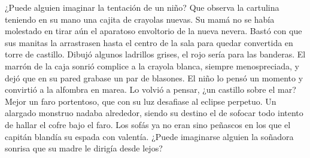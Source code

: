 \markdownRendererInterblockSeparator
{}¿Puede alguien imaginar la tentación de un niño? Que observa la cartulina teniendo en su mano una cajita de crayolas nuevas. Su mamá no se había molestado en tirar aún el aparatoso envoltorio de la nueva nevera. Bastó con que sus manitas la arrastrasen hasta el centro de la sala para quedar convertida en torre de castillo. Dibujó algunos ladrillos grises, el rojo sería para las banderas. El marrón de la caja sonrió complice a la crayola blanca, siempre menospreciada, y dejó que en su pared grabase un par de blasones. El niño lo pensó un momento y convirtió a la alfombra en marea. Lo volvió a pensar, ¿un castillo sobre el mar? Mejor un faro portentoso, que con su luz desafiase al eclipse perpetuo. Un alargado monstruo nadaba alrededor, siendo su destino el de sofocar todo intento de hallar el cofre bajo el faro. Los sofás ya no eran sino peñascos en los que el capitán blandía su espada con valentía. ¿Puede imaginarse alguien la soñadora sonrisa que su madre le dirigía desde lejos?\relax
